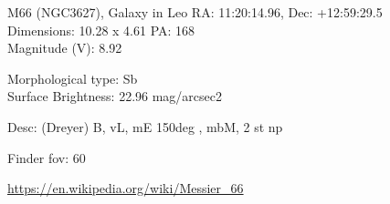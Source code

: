 \begin{block}{M66 (NGC3627), Galaxy in Leo}
    RA: 11:20:14.96, Dec: +12:59:29.5 \\ 
    Dimensions: 10.28 x 4.61 PA: 168 \\ 
    Magnitude (V): 8.92

    Morphological type: Sb \\ 
    Surface Brightness: 22.96 mag/arcsec2 

    Desc: (Dreyer) B, vL, mE 150deg , mbM, 2 st np 

    Finder fov: 60 

    \url{https://en.wikipedia.org/wiki/Messier_66} 
\end{block}